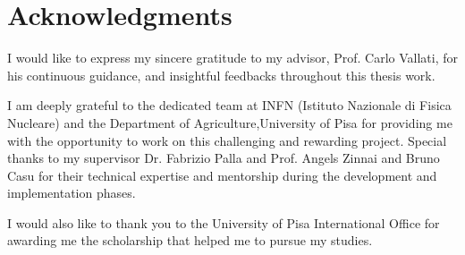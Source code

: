 \chapter*{Acknowledgments}

I would like to express my sincere gratitude to my advisor, Prof. Carlo Vallati, for his continuous guidance, and insightful feedbacks throughout this thesis work.

I am deeply grateful to the dedicated team at INFN (Istituto Nazionale di Fisica Nucleare) and the Department of Agriculture,University of Pisa for providing me with the opportunity to work on this challenging and rewarding project. Special thanks to my supervisor Dr. Fabrizio Palla and Prof. Angels Zinnai and Bruno Casu for their technical expertise and mentorship during the development and implementation phases.

I would also like to thank you to the University of Pisa International Office for awarding me the scholarship that helped me to pursue my studies. 



